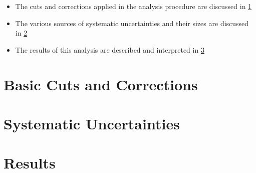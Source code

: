 \begin{itemize}
\item The cuts and corrections applied in the analysis procedure are discussed in  \ref{sec:cuts_corrections}
\item The various sources of systematic uncertainties and their sizes are discussed in \ref{sec:systematic}
\item The results of this analysis are described and interpreted in \ref{sec:results}
\end{itemize}


%
%
%
%
%

%

\section{Basic Cuts and Corrections}
\label{sec:cuts_corrections}


\section{Systematic Uncertainties}
\label{sec:systematic}


\section{Results}
\label{sec:results}


%
